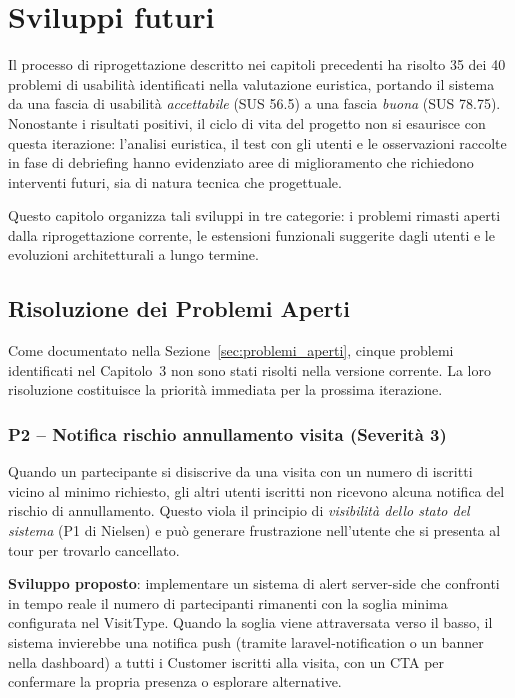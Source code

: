 \chapter{Sviluppi futuri}
\label{ch:sviluppi}

Il processo di riprogettazione descritto nei capitoli precedenti ha risolto 35 dei 40 problemi di usabilità identificati nella valutazione euristica, portando il sistema da una fascia di usabilità \textit{accettabile} (SUS 56.5) a una fascia \textit{buona} (SUS 78.75). Nonostante i risultati positivi, il ciclo di vita del progetto non si esaurisce con questa iterazione: l'analisi euristica, il test con gli utenti e le osservazioni raccolte in fase di debriefing hanno evidenziato aree di miglioramento che richiedono interventi futuri, sia di natura tecnica che progettuale.

Questo capitolo organizza tali sviluppi in tre categorie: i problemi rimasti aperti dalla riprogettazione corrente, le estensioni funzionali suggerite dagli utenti e le evoluzioni architetturali a lungo termine.

\section{Risoluzione dei Problemi Aperti}

Come documentato nella Sezione~\ref{sec:problemi_aperti}, cinque problemi identificati nel Capitolo~3 non sono stati risolti nella versione corrente. La loro risoluzione costituisce la priorità immediata per la prossima iterazione.

\subsection{P2 -- Notifica rischio annullamento visita (Severità 3)}

Quando un partecipante si disiscrive da una visita con un numero di iscritti vicino al minimo richiesto, gli altri utenti iscritti non ricevono alcuna notifica del rischio di annullamento. Questo viola il principio di \textit{visibilità dello stato del sistema} (P1 di Nielsen) e può generare frustrazione nell'utente che si presenta al tour per trovarlo cancellato.

\textbf{Sviluppo proposto}: implementare un sistema di alert server-side che confronti in tempo reale il numero di partecipanti rimanenti con la soglia minima configurata nel VisitType. Quando la soglia viene attraversata verso il basso, il sistema invierebbe una notifica push (tramite laravel-notification o un banner nella dashboard) a tutti i Customer iscritti alla visita, con un CTA per confermare la propria presenza o esplorare alternative.

